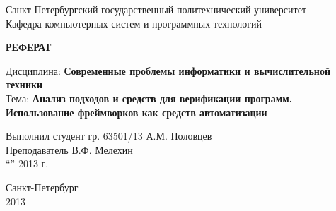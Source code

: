 \documentclass[a4paper,14pt]{extarticle}
\begin{document}
\begin{titlepage}

\begin{center}
  Санкт-Петербургский государственный политехнический университет\\
  Кафедра компьютерных систем и программных технологий
\end{center}

\vspace{13em}

\begin{center}
\textbf{\Large РЕФЕРАТ}

Дисциплина: \textbf{Современные проблемы информатики и вычислительной техники}\\
Тема: \textbf{Анализ подходов и средств для верификации программ.
Использование фреймворков как средств автоматизации}
\end{center}

\vspace{13em}

\begin{flushright}
  Выполнил студент гр. 63501/13 \hspace{8em} А.М. Половцев\\
  Преподаватель \hspace{8em} В.Ф. Мелехин\\
  ``\underline{\hspace{2em}}''\underline{\hspace{8em}} 2013 г.
\end{flushright}

\vspace{\fill}

\begin{center}
  Санкт-Петербург\\
  2013
\end{center}

\end{titlepage}

\tableofcontents

\thispagestyle{empty}








{}


\nocite{*}
\end{document}
